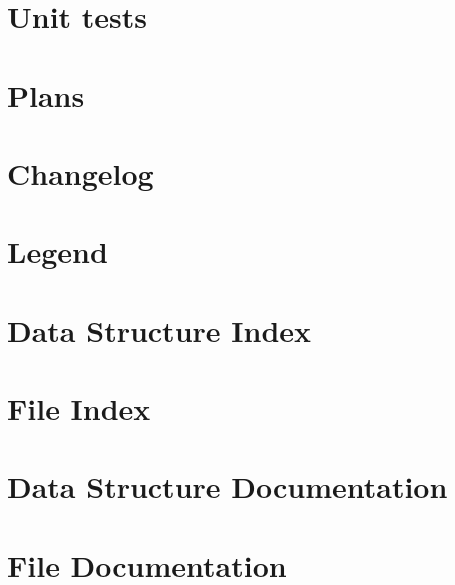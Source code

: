 \documentclass[twoside]{book}
\newcommand{\+}{\discretionary{\mbox{\scriptsize$\hookleftarrow$}}{}{}}
\begin{document}
\chapter{Unit tests}
\label{unit_tests}
\hypertarget{unit_tests}{}

\chapter{Plans}
\label{plans}
\hypertarget{plans}{}

\chapter{Changelog}
\label{changelog}
\hypertarget{changelog}{}

\chapter{Legend}
\label{legend}
\hypertarget{legend}{}

\chapter{Data Structure Index}

\chapter{File Index}

\chapter{Data Structure Documentation}










\chapter{File Documentation}
















\newpage
{}
{}
\printindex
\end{document}

